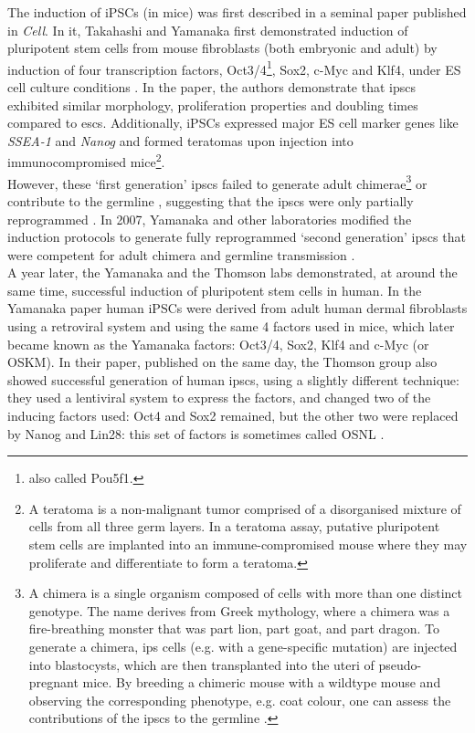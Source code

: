 The induction of iPSCs (in mice) was first described in a seminal paper published in \textit{Cell}.
In it, Takahashi and Yamanaka first demonstrated induction of pluripotent stem cells from mouse fibroblasts (both embryonic and adult) by induction of four transcription factors, Oct3/4\footnote{also called Pou5f1.}, Sox2, c-Myc and Klf4, under ES cell culture conditions \cite{takahashi2006induction}.
In the paper, the authors demonstrate that \glspl{ipsc} exhibited similar morphology, proliferation properties and doubling times compared to \glspl{esc}.
Additionally, iPSCs expressed major ES cell marker genes like \textit{SSEA-1} and \textit{Nanog} and formed teratomas upon injection into immunocompromised mice\footnote{A teratoma is a non-malignant tumor comprised of a disorganised mixture of cells from all three germ layers. 
In a teratoma assay, putative pluripotent stem cells are implanted into an immune-compromised mouse where they may proliferate and differentiate to form a teratoma.}.\\ 

However, these `first generation' \glspl{ipsc} failed to generate adult chimerae\footnote{A chimera is a single organism composed of cells with more than one distinct genotype.
The name derives from Greek mythology, where a chimera was a fire-breathing monster that was part lion, part goat, and part dragon. 
To generate a chimera, \gls{ips} cells (e.g. with a gene-specific mutation) are injected into blastocysts, which are then transplanted into the uteri of pseudo-pregnant mice.
By breeding a chimeric mouse with a wildtype mouse and observing the corresponding phenotype, e.g. coat colour, one can assess the contributions of the \glspl{ipsc} to the germline \cite{okita2007generation}.} or contribute to the germline \cite{takahashi2006induction}, suggesting that the \glspl{ipsc} were only partially reprogrammed \cite{omole2018ten}. 
In 2007, Yamanaka and other laboratories modified the induction protocols to generate fully reprogrammed `second generation' \glspl{ipsc} that were competent for adult chimera and germline transmission \cite{maherali2007directly, wernig2007vitro, okita2007generation}.\\

A year later, the Yamanaka and the Thomson labs demonstrated, at around the same time, successful induction of pluripotent stem cells in human.
In the Yamanaka paper \cite{takahashi2007induction} human iPSCs were derived from adult human dermal fibroblasts using a retroviral system and using the same 4 factors used in mice, which later became known as the Yamanaka factors: Oct3/4, Sox2, Klf4 and c-Myc (or OSKM).
In their paper, published on the same day, the Thomson group also showed successful generation of human \glspl{ipsc}, using a slightly different technique: they used a lentiviral system to express the factors, and changed two of the inducing factors used: Oct4 and Sox2 remained, but the other two were replaced by Nanog and Lin28: this set of factors is sometimes called OSNL \cite{yu2007induced}.\\

